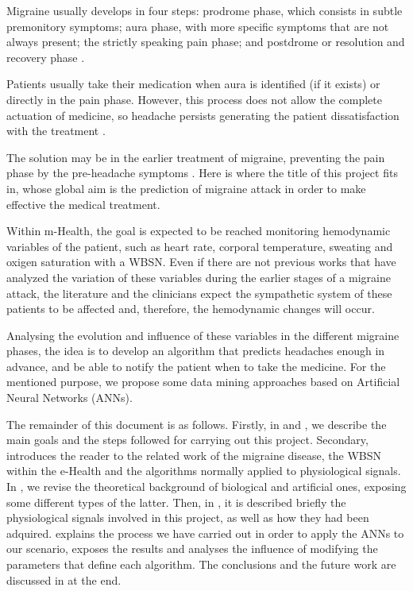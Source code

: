 Migraine usually develops in four steps: prodrome phase, which consists in subtle premonitory symptoms; aura phase, with more specific symptoms that are not always present; the strictly speaking pain phase; and postdrome or resolution and recovery phase \cite{SENmigaura, CUNcefmig}.

Patients usually take their medication when aura is identified (if it exists) or directly in the pain phase. However, this process does not allow the complete actuation of medicine, so headache persists generating the patient dissatisfaction with the treatment \cite{IBCinsatisfacc}.

The solution may be in the earlier treatment of migraine, preventing the pain phase by the pre-headache symptoms \cite{MigAgudaEarlyTreat}. Here is where the title of this project fits in, whose global aim is the prediction of migraine attack in order to make effective the medical treatment.

Within m-Health, the goal is expected to be reached monitoring hemodynamic variables of the patient, such as heart rate, corporal temperature, sweating and oxigen saturation with a WBSN. Even if there are not previous works that have analyzed the variation of these variables during the earlier stages of a migraine attack, the literature and the clinicians expect the sympathetic system of these patients to be affected and, therefore, the hemodynamic changes will occur. 

Analysing the evolution and influence of these variables in the different migraine phases, the idea is to develop an algorithm that predicts headaches enough in advance, and be able to notify the patient when to take the medicine. For the mentioned purpose, we propose some data mining approaches based on Artificial Neural Networks (ANNs). 


The remainder of this document is as follows. Firstly, in  and , we describe the main goals and the steps followed for carrying out this project. Secondary,  introduces the reader to the related work of the migraine disease, the WBSN within the e-Health and the algorithms normally applied to physiological signals. In , we revise the theoretical background of biological and artificial ones, exposing some different types of the latter. Then, in , it is described briefly the physiological signals involved in this project, as well as how they had been adquired.  explains the process we have carried out in order to apply the ANNs to our scenario, exposes the results and analyses the influence of modifying the parameters that define each algorithm. The conclusions and the future work are discussed in  at the end.
